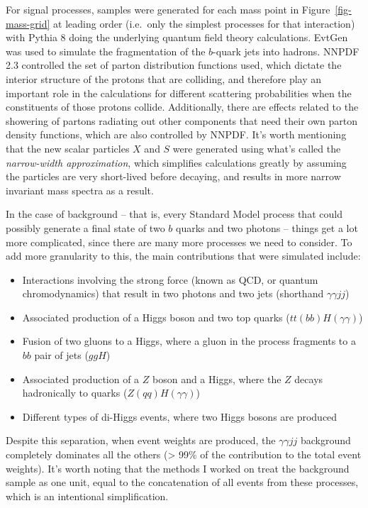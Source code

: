 \documentclass[
  11pt,
  numbers=noendperiod]{book}
\providecommand{\tightlist}{%
  \setlength{\itemsep}{0pt}\setlength{\parskip}{0pt}}\usepackage{longtable,booktabs,array}
\begin{document}
For signal processes, samples were generated for each mass point in
Figure~\ref{fig-mass-grid} at leading order (i.e.~only the simplest
processes for that interaction) with Pythia 8 doing the underlying
quantum field theory calculations. EvtGen was used to simulate the
fragmentation of the \(b\)-quark jets into hadrons. NNPDF 2.3 controlled
the set of parton distribution functions used, which dictate the
interior structure of the protons that are colliding, and therefore play
an important role in the calculations for different scattering
probabilities when the constituents of those protons collide.
Additionally, there are effects related to the showering of partons radiating out other components that need their own parton density functions, which are also controlled by NNPDF. It's worth mentioning that the new
scalar particles \(X\) and \(S\) were generated using what's called the
\emph{narrow-width approximation}, which simplifies calculations greatly
by assuming the particles are very short-lived before decaying, and
results in more narrow invariant mass spectra as a result.

In the case of background -- that is, every Standard Model process that
could possibly generate a final state of two \(b\) quarks and two
photons -- things get a lot more complicated, since there are many more
processes we need to consider. To add more granularity to this, the main
contributions that were simulated include:

\begin{itemize}
\tightlist
\item
  Interactions involving the strong force (known as QCD, or quantum
  chromodynamics) that result in two photons and two jets (shorthand
  \(\gamma\gamma jj\))
\item
  Associated production of a Higgs boson and two top quarks
  (\(tt(bb)H(\gamma \gamma)\))
\item
  Fusion of two gluons to a Higgs, where a gluon in the process
  fragments to a \(bb\) pair of jets (\(ggH\))
\item
  Associated production of a \(Z\) boson and a Higgs, where the \(Z\)
  decays hadronically to quarks (\(Z(qq)H(\gamma \gamma)\))
\item
  Different types of di-Higgs events, where two Higgs bosons are
  produced
\end{itemize}

Despite this separation, when event weights are produced, the
\(\gamma\gamma jj\) background completely dominates all the others
(\textgreater{} 99\% of the contribution to the total event weights).
It's worth noting that the methods I worked on treat the background sample as one
unit, equal to the concatenation of all events from these processes,
which is an intentional simplification.
\end{document}
